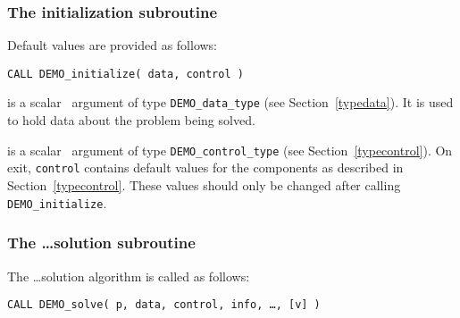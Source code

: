 \documentclass{galahad}
\newcommand{\packagename}{DEMO}
\begin{document}

\subsubsection{The initialization subroutine}\label{subinit}
 Default values are provided as follows:
\vspace*{1mm}

\hspace{8mm}
{\tt CALL \packagename\_initialize( data, control )}

\vspace*{-3mm}
\begin{description}

 is a scalar \intentinout\ argument of type 
{\tt \packagename\_data\_type}
(see Section~\ref{typedata}). It is used to hold data about the problem being 
solved.

 is a scalar \intentout\ argument of type 
{\tt \packagename\_control\_type}
(see Section~\ref{typecontrol}). 
On exit, {\tt control} contains default values for the components as
described in Section~\ref{typecontrol}.
These values should only be changed after calling 
{\tt \packagename\_initialize}.

\end{description}


\subsubsection{The \ldots solution subroutine}
The \ldots solution algorithm is called as follows:
\vspace*{1mm}

\hspace{8mm}
{\tt CALL \packagename\_solve( p, data, control, info, \ldots, [v] )}
\end{document}
